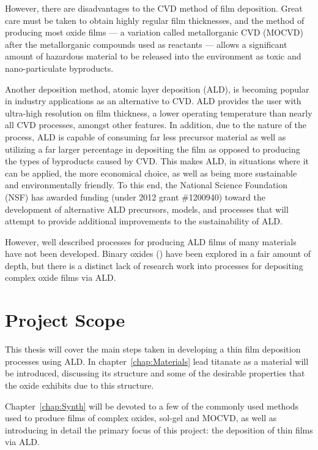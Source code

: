 However, there are disadvantages to the CVD method of film deposition. Great care must be taken to obtain highly regular film thicknesses, and the method of producing most oxide films --- a variation called metallorganic CVD (MOCVD) after the metallorganic compounds used as reactants --- allows a significant amount of hazardous material to be released into the environment as toxic and nano-particulate byproducts. 

Another deposition method, atomic layer deposition (ALD), is becoming popular in industry applications as an alternative to CVD. ALD provides the user with ultra-high resolution on film thickness, a lower operating temperature than nearly all CVD processes, amongst other features. In addition, due to the nature of the process, ALD is capable of consuming far less precursor material as well as utilizing a far larger percentage in depositing the film as opposed to producing the types of byproducts caused by CVD.\cite{ALD-Handbook} This makes ALD, in situations where it can be applied, the more economical choice, as well as being more sustainable and environmentally friendly. To this end, the National Science Foundation (NSF) has awarded funding (under 2012 grant \#1200940) toward the development of alternative ALD precursors, models, and processes that will attempt to provide additional improvements to the sustainability of ALD.

However, well described processes for producing ALD films of many materials have not been developed. Binary oxides () have been explored in a fair amount of depth, but there is a distinct lack of research work into processes for depositing complex oxide films via ALD. 


\section{Project Scope}
\label{sec:Intro-Scope}

This thesis will cover the main steps taken in developing a thin film deposition processes using ALD. In chapter~\ref{chap:Materials} lead titanate as a material will be introduced, discussing its structure and some of the desirable properties that the oxide exhibits due to this structure. 

Chapter~\ref{chap:Synth} will be devoted to a few of the commonly used methods used to produce films of complex oxides, sol-gel and MOCVD, as well as introducing in detail the primary focus of this project: the deposition of thin films via ALD. 

